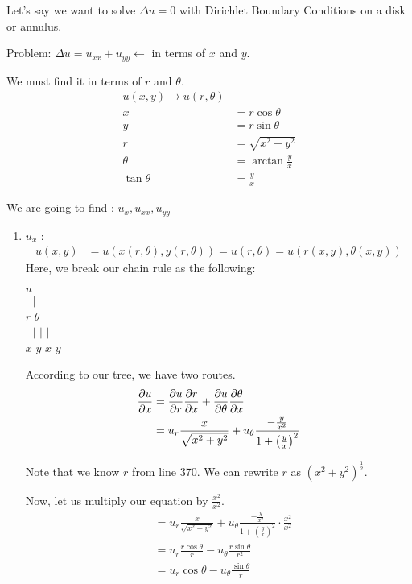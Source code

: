 
Let's say we want to solve $\Delta u = 0$ with Dirichlet Boundary Conditions on a disk or annulus.

Problem: $\Delta u = u_{xx} + u_{yy} \leftarrow $ in terms of $x$ and $y$.

We must find it in terms of $r$ and $\theta$.
%
\begin{align}
  u(x, y) \rightarrow u(r, \theta)\\
  x & = r \cos \theta\\
  y & = r \sin \theta\\
  r & = \sqrt{x^2 + y^2}\\
  \theta & = \arctan \frac{y}{x}\\
  \tan \theta & = \frac{y}{x}
\end{align}

We are going to find : $u_x, u_{xx}, u_{yy}$
%
\begin{enumerate}
  \item $u_x$ :
  \begin{align}
    u(x, y) & = u( x(r, \theta), y(r, \theta)) = u(r, \theta) = u(r(x, y), \theta(x, y))
  \end{align}
  Here, we break our chain rule as the following:
  \begin{center}
    $u$\\
    $|$ \quad \quad $|$\\
    $r$ \quad \quad $\theta$\\
    $|$ \quad $|$ \quad $|$ \quad $|$\\
    $x$ \quad $y$ \quad $x$ \quad $y$
  \end{center}

  According to our tree, we have two routes.
  \begin{align}
    \frac{\partial u}{\partial x} & = \frac{\partial u}{\partial r} \frac{\partial r}{\partial x} + \frac{\partial u}{\partial \theta} \frac{\partial \theta}{\partial x}\\
    & = u_r \frac{x}{\sqrt{x^2 + y^2}} + u_\theta \frac{- \frac{y}{x^2}}{1 + \left( \frac{y}{x}\right)^2}
  \end{align}

  Note that we know $r$ from line 370. We can rewrite $r$ as $(x^2 + y^2)^{\frac{1}{2}}$.

  Now, let us multiply our equation by $\frac{x^2}{x^2}$.
  \begin{align}
    & = u_r \frac{x}{\sqrt{x^2 + y^2}} + u_\theta \frac{- \frac{y}{x^2}}{1 + \left( \frac{y}{x}\right)^2} \cdot \frac{x^2}{x^2}\\
    & = u_r \frac{r \cos\theta}{r} - u_\theta \frac{r \sin \theta}{r^2}\\
    & = u_r \cos\theta - u_\theta \frac{\sin \theta}{r}
  \end{align}
\end{enumerate}

